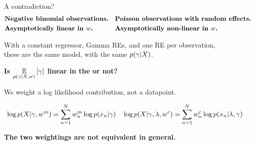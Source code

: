\begin{frame}{A contradiction?}
    \vspace{-1em}
    \begin{align*}
    &\text{\textbf{Negative binomial observations.}}
    &
    &\text{\textbf{Poisson observations with random effects.}}
    \\
    &\text{\textbf{Asymptotically linear in $w$.}}
    &
    &\text{\textbf{Asymptotically non-linear in $w$.}}
    \end{align*}
    \begin{center}
    With a constant regressor, Gamma REs, and one RE per observation,\\
    these are the same model, with the same $p(\gamma \vert X)$.
    
    \textbf{Is $\underset{p(\gamma \vert X, w)}{\mathbb{E}}\left[\gamma\right]$
    linear in the 
    or not?}
    
    \spskip

    \textbf{}  We weight a log likelihood
    contribution, not a datapoint.

    \begin{align*}
        &\log p(X \vert \gamma, w^{m}) =
            \sum_{n=1}^N w^{m}_n \log p(x_n \vert \gamma)
        &
        &\log p(X \vert \gamma, \lambda, w^{c}) =
            \sum_{n=1}^N w^{c}_n \log p(x_n \vert \lambda, \gamma)
    \end{align*}
        

    \textbf{The two weightings are not equivalent in general.}
    
    \end{center}
\end{frame}


